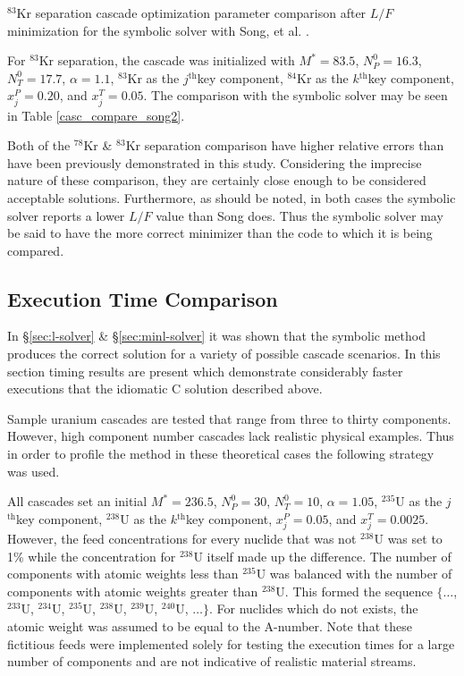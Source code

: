 \documentclass[preprint,12pt]{elsarticle}
\newcommand{\superscript}[1]{\ensuremath{^{\textrm{#1}}}}
\newcommand{\nuc}[2]{\superscript{#2}{#1}}
\newcommand{\jth}[0]{$j$\superscript{th}}
\newcommand{\kth}[0]{$k$\superscript{th}}
\begin{document}
\begin{table}[htbp]
\begin{center}
\caption{\nuc{Kr}{83} separation cascade optimization parameter comparison after 
    $L/F$ minimization for the symbolic 
    solver with Song, et al. \cite{doi:10.1080/01496391003793884}.}

\end{center}
\label{casc_compare_song2}
\end{table}

For \nuc{Kr}{83} separation, the cascade was initialized with $M^*=83.5$, 
$N_P^0=16.3$, $N_T^0=17.7$, $\alpha=1.1$, \nuc{Kr}{83} as the \jth key
component, \nuc{Kr}{84} as the \kth key component, $x_j^P=0.20$, and
$x_j^T=0.05$.  The comparison with the symbolic solver may be seen in Table
\ref{casc_compare_song2}.

Both of the \nuc{Kr}{78} \&  \nuc{Kr}{83} separation comparison have higher 
relative errors than have been previously demonstrated in this study.  
Considering the imprecise nature of these comparison, 
they are certainly close enough to be considered acceptable solutions.  
Furthermore, as should be noted, in both cases the symbolic solver reports a 
lower $L/F$ value than Song does.  Thus the symbolic solver may be said to have
the more correct minimizer than the code to which it is being compared.

\subsection{Execution Time Comparison}
\label{sec:timings-solver}

In \S\ref{sec:l-solver} \& \S\ref{sec:minl-solver} it was shown that the symbolic 
method produces the correct solution for a variety of possible cascade scenarios.
In this section timing results are present which demonstrate considerably faster
executions that the idiomatic C solution described above.

Sample uranium cascades are tested that range from three to thirty components.  
However, high component number cascades lack realistic physical examples.  
Thus in order to profile the method in these theoretical cases the following strategy
was used.

All cascades set  an initial $M^*=236.5$,
$N_P^0=30$, $N_T^0=10$, $\alpha=1.05$, \nuc{U}{235} as the \jth key
component, \nuc{U}{238} as the \kth key component, $x_j^P=0.05$, and
$x_j^T=0.0025$.  However, the feed concentrations for every nuclide that was not
\nuc{U}{238} was set to 1\%
while the concentration for \nuc{U}{238} itself made up the difference.  The number
of components with atomic weights less than \nuc{U}{235} was balanced with the 
number of components with atomic weights greater than \nuc{U}{238}.  This formed
the sequence $\{\ldots$, \nuc{U}{233}, \nuc{U}{234}, \nuc{U}{235}, \nuc{U}{238}, 
\nuc{U}{239}, \nuc{U}{240}, $\ldots\}$.  For nuclides which do not exists, the 
atomic weight was assumed to be equal to the A-number.  Note that these fictitious
feeds were implemented solely for testing the execution times for a large number
of components and are not indicative of realistic material streams.
\end{document}
